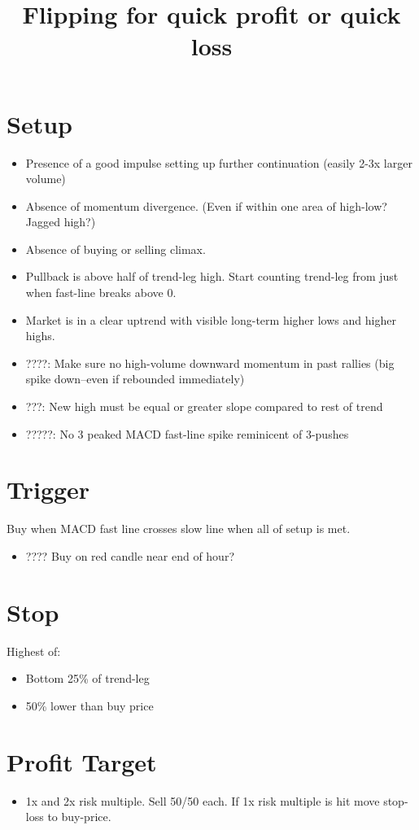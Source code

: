 \documentclass{../notes}
\title{Flipping for quick profit or quick loss}
\begin{document}
\maketitle

\section{Setup}
\begin{itemize}
  \item Presence of a good impulse setting up further continuation (easily 2-3x larger volume)
  \item Absence of momentum divergence. (Even if within one area of high-low? Jagged high?)
  \item Absence of buying or selling climax.
  \item Pullback is above half of trend-leg high. Start counting trend-leg from just when fast-line breaks above 0.
  \item Market is in a clear uptrend with visible long-term higher lows and higher highs.
  \item ????: Make sure no high-volume downward momentum in past rallies (big spike down--even if rebounded immediately)
  \item ???: New high must be equal or greater slope compared to rest of trend
  \item ?????: No 3 peaked MACD fast-line spike reminicent of 3-pushes
\end{itemize}

\section{Trigger}
Buy when MACD fast line crosses slow line when all of setup is met.
\begin{itemize}
  \item ???? Buy on red candle near end of hour?
\end{itemize}

\section{Stop}
Highest of:
\begin{itemize}
  \item Bottom 25\% of trend-leg
  \item 50\% lower than buy price
\end{itemize}
\section{Profit Target}
\begin{itemize}
  \item 1x and 2x risk multiple. Sell 50/50 each. If 1x risk multiple is hit move stop-loss to buy-price.
\end{itemize}
\end{document}
